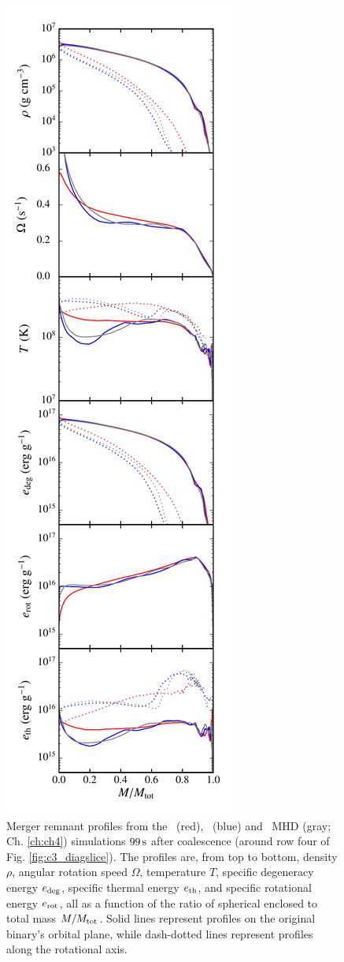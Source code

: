 \begin{figure}
\centering
\includegraphics[angle=0,width=0.35\columnwidth]{chapter3_zhu+u/figures/curves.pdf}
\caption{Merger remnant profiles from the \gasoline\ (red), \arepo\ (blue) and \arepo\ MHD (gray; Ch. \ref{ch:ch4}) simulations $99\,\mathrm{s}$ after coalescence (around row four of Fig. \ref{fig:c3_diagslice}).  The profiles are, from top to bottom, density $\rho$, angular rotation speed $\Omega$, temperature $T$, specific degeneracy energy  $e_{\rm deg}$, specific thermal energy $e_{\rm th}$, and specific rotational energy $e_{\rm rot}$, all as a function of the ratio of spherical enclosed to total mass $M/M_{\rm tot}$.  Solid lines represent profiles on the original binary's orbital plane, while dash-dotted lines represent profiles along the rotational axis.}
\label{fig:c3_curves}
\end{figure}

